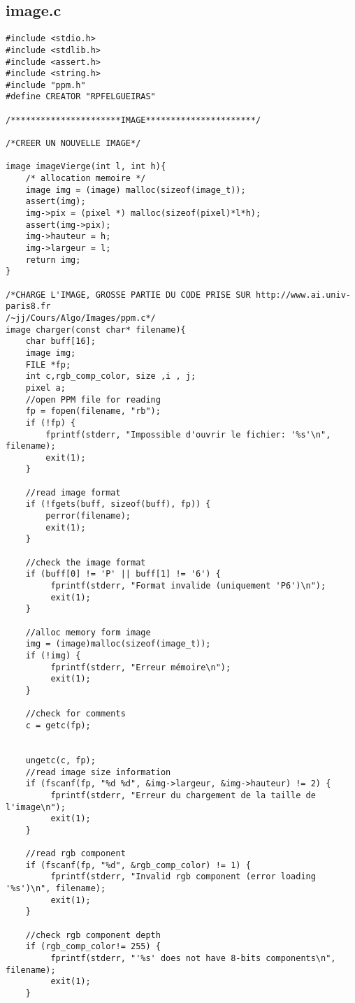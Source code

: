 \documentclass[a4paper , 10pt]{article}
\begin{document}
\subsection{image.c}
\begin{verbatim}
#include <stdio.h>
#include <stdlib.h>
#include <assert.h>
#include <string.h>
#include "ppm.h"
#define CREATOR "RPFELGUEIRAS"

/**********************IMAGE**********************/

/*CREER UN NOUVELLE IMAGE*/

image imageVierge(int l, int h){
	/* allocation memoire */
	image img = (image) malloc(sizeof(image_t));
	assert(img);
	img->pix = (pixel *) malloc(sizeof(pixel)*l*h);
    assert(img->pix);
	img->hauteur = h;
    img->largeur = l;
    return img;
}

/*CHARGE L'IMAGE, GROSSE PARTIE DU CODE PRISE SUR http://www.ai.univ-paris8.fr
/~jj/Cours/Algo/Images/ppm.c*/
image charger(const char* filename){
    char buff[16];
    image img;
    FILE *fp;
    int c,rgb_comp_color, size ,i , j;
    pixel a;
    //open PPM file for reading
    fp = fopen(filename, "rb");
    if (!fp) {
        fprintf(stderr, "Impossible d'ouvrir le fichier: '%s'\n", filename);
        exit(1);
    }

    //read image format
    if (!fgets(buff, sizeof(buff), fp)) {
        perror(filename);
        exit(1);
    }

    //check the image format
    if (buff[0] != 'P' || buff[1] != '6') {
         fprintf(stderr, "Format invalide (uniquement 'P6')\n");
         exit(1);
    }

    //alloc memory form image
    img = (image)malloc(sizeof(image_t));
    if (!img) {
         fprintf(stderr, "Erreur mémoire\n");
         exit(1);
    }

    //check for comments
    c = getc(fp);


    ungetc(c, fp);
    //read image size information
    if (fscanf(fp, "%d %d", &img->largeur, &img->hauteur) != 2) {
         fprintf(stderr, "Erreur du chargement de la taille de l'image\n");
         exit(1);
    }

    //read rgb component
    if (fscanf(fp, "%d", &rgb_comp_color) != 1) {
         fprintf(stderr, "Invalid rgb component (error loading '%s')\n", filename);
         exit(1);
    }

    //check rgb component depth
    if (rgb_comp_color!= 255) {
         fprintf(stderr, "'%s' does not have 8-bits components\n", filename);
         exit(1);
    }


\end{verbatim}
\end{document}
